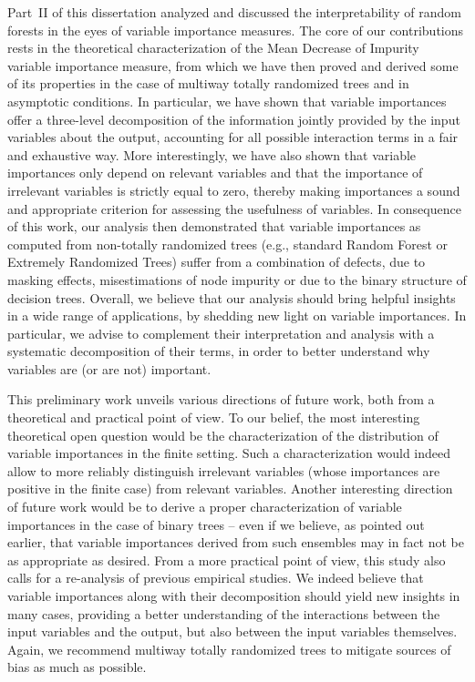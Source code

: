 Part~\textsc{II} of this dissertation analyzed and discussed the
interpretability of random forests in the eyes of variable importance measures.
The core of our contributions rests in the theoretical characterization of the
Mean Decrease of Impurity variable importance measure, from which we have then
proved and derived some of its properties in the case of multiway totally
randomized trees and in asymptotic conditions. In particular, we have shown
that variable importances offer a three-level decomposition of the information
jointly provided by the input variables about the output, accounting for all
possible interaction terms in a fair and exhaustive way. More interestingly, we
have also shown that variable importances only depend on relevant variables and
that the importance of irrelevant variables is strictly equal to zero, thereby
making importances a sound and appropriate criterion for assessing the
usefulness of variables. In consequence of this work, our analysis then
demonstrated that variable importances as computed from non-totally randomized
trees (e.g., standard Random Forest or Extremely Randomized Trees) suffer from
a combination of defects, due to masking effects, misestimations of node
impurity or due to the binary structure of decision trees. Overall, we believe
that our analysis should bring helpful insights in a wide range of
applications, by shedding new light on variable importances. In particular, we
advise to complement their interpretation and analysis with a systematic
decomposition of their terms, in order to better understand why variables are
(or are not) important.

This preliminary work unveils various directions of future work, both from a
theoretical and practical point of view. To our belief, the most interesting
theoretical open question would be the characterization of the distribution of
variable importances in the finite setting. Such a characterization would
indeed allow to more reliably distinguish irrelevant variables (whose
importances are positive in the finite case) from relevant variables. Another
interesting direction of future work would be to derive a proper
characterization of variable importances in the case of binary trees -- even if we
believe, as pointed out earlier, that variable importances derived from such
ensembles may in fact not be as appropriate as desired. From a more practical
point of view, this study also calls for a re-analysis of previous empirical
studies. We indeed believe that variable importances along with their
decomposition should yield new insights in many cases, providing a better
understanding of the interactions between the input variables and the output,
but also between the input variables themselves. Again, we recommend multiway
totally randomized trees to mitigate sources of bias as much as possible.

